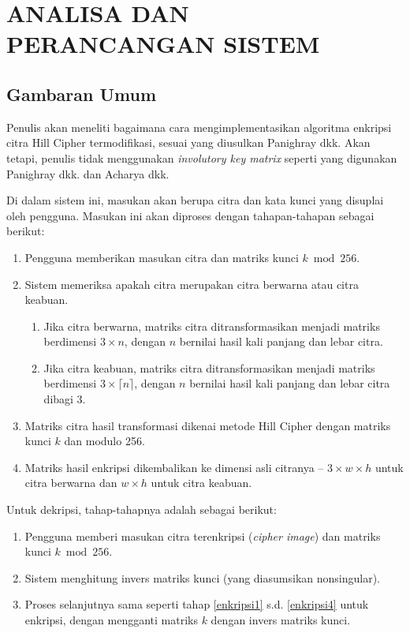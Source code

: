 \chapter{ANALISA DAN PERANCANGAN SISTEM}

%
\vspace{12pt}

\section{Gambaran Umum}
Penulis akan meneliti bagaimana cara mengimplementasikan algoritma
enkripsi citra Hill Cipher termodifikasi, sesuai yang diusulkan Panighray dkk.
Akan tetapi, penulis tidak menggunakan \textit{involutory key matrix} seperti yang
digunakan Panighray dkk. dan Acharya dkk.\par
Di dalam sistem ini, masukan akan berupa citra dan kata kunci yang
disuplai oleh pengguna. Masukan ini akan diproses dengan tahapan-tahapan sebagai berikut:
	\begin{enumerate}[label=(\alph*)]
	\item \label{enkripsi1} Pengguna memberikan masukan citra dan matriks kunci $k\bmod 256$.
	\item \label{enkripsi2} Sistem memeriksa apakah citra merupakan citra berwarna atau citra keabuan.
		\begin{enumerate}[label=\arabic*.]
		\item Jika citra berwarna, matriks citra ditransformasikan menjadi matriks 
			berdimensi $3\times n$, dengan $n$ bernilai hasil kali panjang dan lebar citra.
		\item Jika citra keabuan, matriks citra ditransformasikan menjadi matriks 
			berdimensi $3\times\lceil n\rceil$, dengan $n$ bernilai hasil kali 
			panjang dan lebar citra dibagi 3.
		\end{enumerate}
	\item \label{enkripsi3} Matriks citra hasil transformasi dikenai metode Hill Cipher dengan 
		matriks kunci $k$ dan modulo 256.
	\item \label{enkripsi4} Matriks hasil enkripsi dikembalikan ke dimensi asli citranya -- $3\times w\times h$ 
		untuk citra berwarna dan $w\times h$ untuk citra keabuan.
	\end{enumerate}
Untuk dekripsi, tahap-tahapnya adalah sebagai berikut:
	\begin{enumerate}[label=(\alph*)]
	\item Pengguna memberi masukan citra terenkripsi (\textit{cipher image}) dan matriks kunci $k\bmod 256$.
	\item Sistem menghitung invers matriks kunci (yang diasumsikan nonsingular).
	\item Proses selanjutnya sama seperti tahap \ref{enkripsi1} s.d. \ref{enkripsi4} untuk enkripsi,
		dengan mengganti matriks $k$ dengan invers matriks kunci.
	\end{enumerate}
\newpage